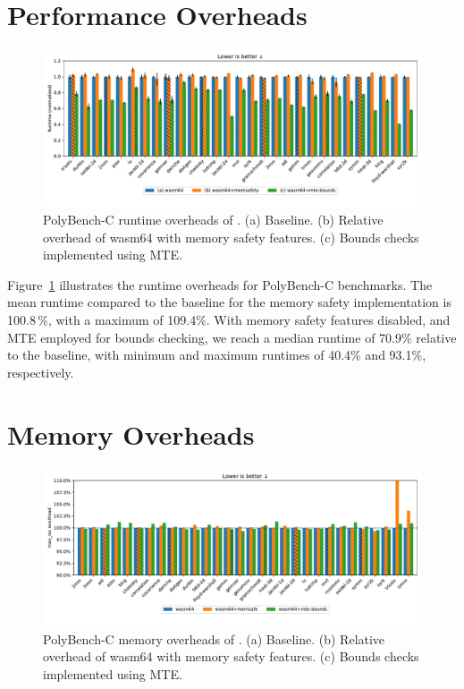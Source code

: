 \section{Performance Overheads}

\begin{figure}[ht]
    \centering
    \includegraphics[width=\textwidth]{./plots/runtimes}
    \caption{{PolyBench-C runtime overheads of {\projectname{}}. (a) Baseline. (b) Relative overhead of wasm64 with memory safety features. (c) Bounds checks implemented using MTE.}{}}
    \label{fig:runtime_overheads}
\end{figure}

Figure~\ref{fig:runtime_overheads} illustrates the runtime overheads for PolyBench-C benchmarks.
The mean runtime compared to the baseline for the memory safety implementation is 100.8\,\%, with a maximum of 109.4\%.
With memory safety features disabled, and MTE employed for bounds checking, we reach a median runtime of 70.9\% relative to the baseline, with minimum and maximum runtimes of 40.4\% and 93.1\%, respectively.



\section{Memory Overheads}\label{sec:memory-overheads}

\begin{figure}[ht]
    \centering
    \includegraphics[width=\textwidth]{./plots/mem-overhead}
    \caption{{PolyBench-C memory overheads of {\projectname{}}. (a) Baseline. (b) Relative overhead of wasm64 with memory safety features. (c) Bounds checks implemented using MTE.}{}}
    \label{fig:memory_overheads}
\end{figure}

